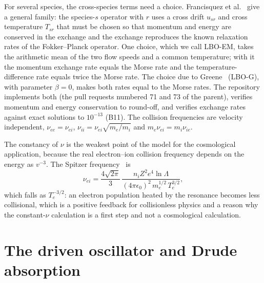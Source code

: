 For several species, the cross-species terms need a choice. Francisquez et al.~\citep{Francisquez2022} give a general family: the species-$s$ operator with $r$ uses a cross drift $u_{sr}$ and cross temperature $T_{sr}$ that must be chosen so that momentum and energy are conserved in the exchange and the exchange reproduces the known relaxation rates of the Fokker--Planck operator. One choice, which we call LBO-EM, takes the arithmetic mean of the two flow speeds and a common temperature; with it the momentum exchange rate equals the Morse rate and the temperature-difference rate equals twice the Morse rate. The choice due to Greene~\citep{Greene1973} (LBO-G), with parameter $\beta=0$, makes both rates equal to the Morse rates. The repository implements both (the pull requests numbered 71 and 73 of the parent), verifies momentum and energy conservation to round-off, and verifies exchange rates against exact solutions to $10^{-13}$ (B11). The collision frequencies are velocity independent, $\nu_{ee}=\nu_{ei}$, $\nu_{ii}=\nu_{ei}\sqrt{m_e/m_i}$ and $m_e\nu_{ei}=m_i\nu_{ie}$.

The constancy of $\nu$ is the weakest point of the model for the cosmological application, because the real electron--ion collision frequency depends on the energy as $v^{-3}$. The Spitzer frequency~\citep{Spitzer1962,Braginskii1965} is
\begin{equation}
\nu_{ei}=\frac{4\sqrt{2\pi}}{3}\,\frac{n_iZ^2e^4\ln\Lambda}{(4\pi\epsilon_0)^2\,m_e^{1/2}\,T_e^{3/2}} ,
\end{equation}
which falls as $T_e^{-3/2}$: an electron population heated by the resonance becomes less collisional, which is a positive feedback for collisionless physics and a reason why the constant-$\nu$ calculation is a first step and not a cosmological calculation.

\section{The driven oscillator and Drude absorption}\label{sec:drude}

